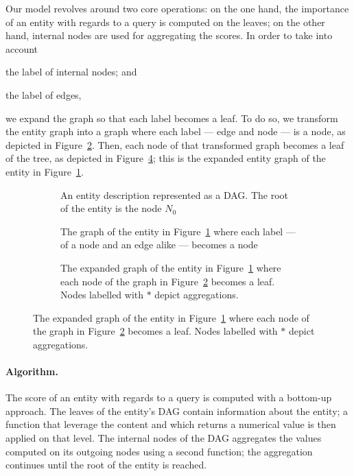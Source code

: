 Our model revolves around two core operations: on the one hand, the importance of an entity with regards to a query is computed on the leaves; on the other hand, internal nodes are used for aggregating the scores. In order to take into account
\begin{inparaenum}[(a)]
	\item the label of internal nodes; and
	\item the label of edges,
\end{inparaenum}
we expand the graph so that each label becomes a leaf. To do so, we transform the entity graph into a graph where each label --- edge and node --- is a node, as depicted in Figure~\ref{fig:expanded-graph1}. Then, each node of that transformed graph becomes a leaf of the tree, as depicted in Figure~\ref{fig:expanded-graph2}; this is the expanded entity graph of the entity in Figure~\ref{fig:concept-tree}.

\begin{figure}
	\centering
	\begin{subfigure}{.3\textwidth}
		\centering
		\resizebox{\textwidth}{!}{
			
		}
		\caption{An entity description represented as a DAG. The root of the entity is the node $N_0$}
		\label{fig:concept-tree}
	\end{subfigure}
	\quad
	\begin{subfigure}{.3\textwidth}
		\centering
		\resizebox{\textwidth}{!}{
			
		}
		\caption{The graph of the entity in Figure~\ref{fig:concept-tree} where each label --- of a node and an edge alike --- becomes a node}
		\label{fig:expanded-graph1}
	\end{subfigure}
	\qquad
	\begin{subfigure}{.7\textwidth}
		\centering
		\resizebox{\textwidth}{!}{
			
		}
		\caption{The expanded graph of the entity in Figure~\ref{fig:concept-tree} where each node of the graph in Figure~\ref{fig:expanded-graph1} becomes a leaf. Nodes labelled with $*$ depict aggregations.}
		\label{fig:expanded-graph2}
	\end{subfigure}
\end{figure}

\paragraph{Algorithm.}

The score of an entity with regards to a query is computed with a bottom-up approach. The leaves of the entity's DAG contain information about the entity; a function that leverage the content and which returns a numerical value is then applied on that level. The internal nodes of the DAG aggregates the values computed on its outgoing nodes using a second function; the aggregation continues until the root of the entity is reached.

